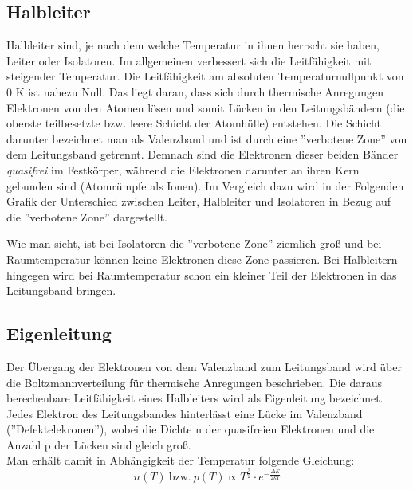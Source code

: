 \documentclass{article}
\begin{document}
\subsection{Halbleiter}
Halbleiter sind, je nach dem welche Temperatur in ihnen herrscht sie haben, Leiter oder Isolatoren. Im allgemeinen verbessert sich die Leitfähigkeit mit steigender Temperatur. Die Leitfähigkeit am absoluten Temperaturnullpunkt von 0 K ist nahezu Null. 
Das liegt daran, dass sich durch thermische Anregungen Elektronen von den Atomen lösen und somit 
Lücken in den Leitungsbändern (die oberste teilbesetzte bzw. leere Schicht der Atomhülle) 
entstehen. Die 
Schicht darunter bezeichnet man als Valenzband und ist durch eine ''verbotene Zone'' von dem 
Leitungsband getrennt. Demnach sind die Elektronen dieser beiden Bänder {\it quasifrei} im 
Festkörper, während die Elektronen darunter an ihren Kern gebunden sind (Atomrümpfe als Ionen). 
Im Vergleich dazu wird in der Folgenden Grafik der Unterschied zwischen Leiter, 
Halbleiter und Isolatoren in Bezug 
auf die ''verbotene Zone'' dargestellt.
\begin{center}
\begin{minipage}{\linewidth}
\centering
{}
%
\label{halbleiter}
\end{minipage}
\end{center}

Wie man sieht, ist bei Isolatoren die ''verbotene Zone'' ziemlich groß und bei Raumtemperatur können keine Elektronen diese Zone passieren. Bei Halbleitern hingegen wird bei Raumtemperatur schon ein kleiner Teil der Elektronen in das Leitungsband bringen.

\subsection{Eigenleitung}
Der Übergang der Elektronen von dem Valenzband zum Leitungsband wird über die Boltzmannverteilung für thermische Anregungen beschrieben. Die daraus berechenbare Leitfähigkeit eines Halbleiters wird als Eigenleitung bezeichnet. Jedes Elektron des Leitungsbandes hinterlässt eine Lücke im Valenzband (''Defektelekronen''), wobei die Dichte n der quasifreien Elektronen und die Anzahl p der Lücken sind gleich groß.\\
Man erhält damit in Abhängigkeit der Temperatur folgende Gleichung:
\begin{equation}
n(T)\ \text{bzw.}\ p(T) \propto T^{\frac{3}{2}}\cdot e^{-\frac{\Delta E}{2kT}}
\end{equation}
\end{document}
